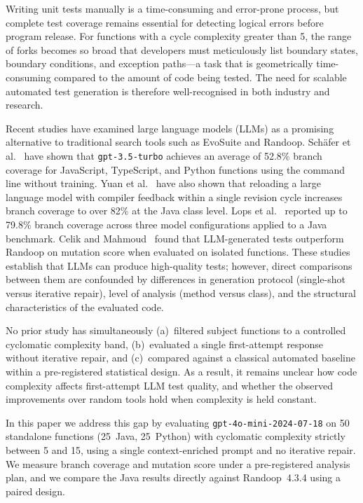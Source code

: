 \documentclass[conference]{IEEEtran}
\begin{document}
Writing unit tests manually is a time-consuming and error-prone process, but complete test coverage remains essential for detecting logical errors before program release. For functions with a cycle complexity greater than 5, the range of forks becomes so broad that developers must meticulously list boundary states, boundary conditions, and exception paths---a task that is geometrically time-consuming compared to the amount of code being tested. The need for scalable automated test generation is therefore well-recognised in both industry and research.

Recent studies have examined large language models (LLMs) as a promising alternative to traditional search tools such as EvoSuite and Randoop. Sch{\"a}fer et al.~\cite{schafer2024testpilot} have shown that \texttt{gpt-3.5-turbo} achieves an average of 52.8\% branch coverage for JavaScript, TypeScript, and Python functions using the command line without training. Yuan et al.~\cite{yuan2024chattester} have also shown that reloading a large language model with compiler feedback within a single revision cycle increases branch coverage to over 82\% at the Java class level. Lops et al.~\cite{lops2025agonetest} reported up to 79.8\% branch coverage across three model configurations applied to a Java benchmark. Celik and Mahmoud~\cite{celik2026gem} found that LLM-generated tests outperform Randoop on mutation score when evaluated on isolated functions. These studies establish that LLMs can produce high-quality tests; however, direct comparisons between them are confounded by differences in generation protocol (single-shot versus iterative repair), level of analysis (method versus class), and the structural characteristics of the evaluated code.

No prior study has simultaneously (a)~filtered subject functions to a controlled cyclomatic complexity band, (b)~evaluated a single first-attempt response without iterative repair, and (c)~compared against a classical automated baseline within a pre-registered statistical design. As a result, it remains unclear how code complexity affects first-attempt LLM test quality, and whether the observed improvements over random tools hold when complexity is held constant.

In this paper we address this gap by evaluating \texttt{gpt-4o-mini-2024-07-18} on 50 standalone functions (25~Java, 25~Python) with cyclomatic complexity strictly between 5 and 15, using a single context-enriched prompt and no iterative repair. We measure branch coverage and mutation score under a pre-registered analysis plan, and we compare the Java results directly against Randoop~4.3.4 using a paired design.
\end{document}

